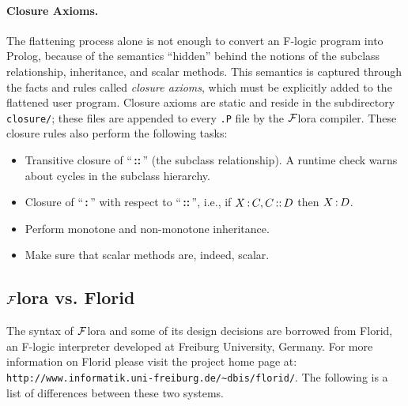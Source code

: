 \documentclass[11pt]{article}
\newcommand{\isa}{\,{\bf{:}}\,}
\newcommand{\subcl}{\,{\bf{::}}\,}
\newcommand{\FLORA}{{\mbox{${\cal F}${\sc lora}}}\xspace}
\newcommand{\FLORID}{{\mbox{\sc Florid}}\xspace}
\newcommand{\fl}{{F-logic}\xspace}
\begin{document}
\paragraph{Closure Axioms.}

The flattening process alone is not enough to convert an \fl program
into Prolog, because of the semantics ``hidden'' behind the notions of
the subclass relationship, inheritance, and scalar methods. This semantics
is captured through the facts and rules called \emph{closure axioms}, which
must be explicitly added to the flattened user program.  Closure axioms are
static and reside in the subdirectory \texttt{closure/}; these files are
appended to every {\tt *.P} file by the \FLORA compiler. These closure
rules also perform the following tasks:

\begin{itemize}
\item Transitive closure of ``\subcl'' (the subclass relationship).  A
  runtime check warns about cycles in the subclass hierarchy.
\item Closure of ``\isa'' with respect to ``\subcl'', i.e., if $X\isa C,
  C\subcl D$ then $X\isa D$.
\item Perform monotone and non-monotone inheritance.
\item Make sure that scalar methods are, indeed, scalar.
\end{itemize}


\subsection{\FLORA vs. \FLORID}

The syntax of \FLORA and some of its design decisions are borrowed from
\FLORID, an \fl interpreter developed at Freiburg University, Germany.
For more information on Florid please visit the project home page at:
\verb|http://www.informatik.uni-freiburg.de/~dbis/florid/|. The following
is a list of differences between these two systems.
\end{document}
